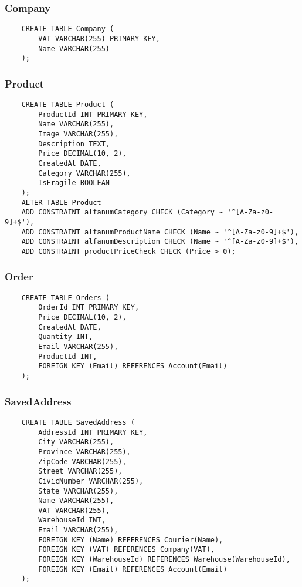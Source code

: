\newpage

\subsubsection{Company}

\begin{lstlisting}
    CREATE TABLE Company (
        VAT VARCHAR(255) PRIMARY KEY,
        Name VARCHAR(255)
    );
\end{lstlisting}

\subsubsection{Product}

\begin{lstlisting}
    CREATE TABLE Product (
        ProductId INT PRIMARY KEY,
        Name VARCHAR(255),
        Image VARCHAR(255),
        Description TEXT,
        Price DECIMAL(10, 2),
        CreatedAt DATE,
        Category VARCHAR(255),
        IsFragile BOOLEAN
    );
    ALTER TABLE Product
    ADD CONSTRAINT alfanumCategory CHECK (Category ~ '^[A-Za-z0-9]+$'),
    ADD CONSTRAINT alfanumProductName CHECK (Name ~ '^[A-Za-z0-9]+$'),
    ADD CONSTRAINT alfanumDescription CHECK (Name ~ '^[A-Za-z0-9]+$'),
    ADD CONSTRAINT productPriceCheck CHECK (Price > 0);
\end{lstlisting}

\subsubsection{Order}

\begin{lstlisting}
    CREATE TABLE Orders (
        OrderId INT PRIMARY KEY,
        Price DECIMAL(10, 2),
        CreatedAt DATE,
        Quantity INT,
        Email VARCHAR(255),
        ProductId INT,
        FOREIGN KEY (Email) REFERENCES Account(Email)
    );
\end{lstlisting}

\newpage

\subsubsection{SavedAddress}

\begin{lstlisting}
    CREATE TABLE SavedAddress (
        AddressId INT PRIMARY KEY,
        City VARCHAR(255),
        Province VARCHAR(255),
        ZipCode VARCHAR(255),
        Street VARCHAR(255),
        CivicNumber VARCHAR(255),
        State VARCHAR(255),
        Name VARCHAR(255),
        VAT VARCHAR(255),
        WarehouseId INT,
        Email VARCHAR(255),
        FOREIGN KEY (Name) REFERENCES Courier(Name),
        FOREIGN KEY (VAT) REFERENCES Company(VAT),
        FOREIGN KEY (WarehouseId) REFERENCES Warehouse(WarehouseId),
        FOREIGN KEY (Email) REFERENCES Account(Email)
    );
\end{lstlisting}

